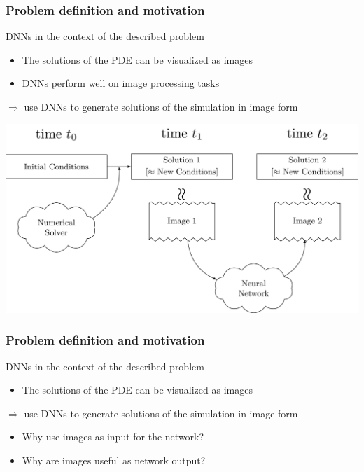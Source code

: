\documentclass[18pt]{beamer}
\begin{document}
\begin{frame}[t]
  \frametitle{Problem definition and motivation}
  DNNs in the context of the described problem
  \begin{itemize}
  \item The solutions of the PDE can be visualized as images
  \item DNNs perform well on image processing tasks
  \end{itemize}
  $\Longrightarrow$ use DNNs to generate solutions of the simulation in image form \\
  \begin{center}
    \includegraphics[scale=0.16]{images/new/overview}
  \end{center}
\end{frame}


\begin{frame}[t]
  \frametitle{Problem definition and motivation}
  DNNs in the context of the described problem
  \begin{itemize}
  \item The solutions of the PDE can be visualized as images
  \end{itemize}
  $\Longrightarrow$ use DNNs to generate solutions of the simulation in image form \\
  \vspace*{1.5cm}
  \begin{itemize}
  \item Why use images as input for the network?
  \item Why are images useful as network output?
  \end{itemize}
\end{frame}
\end{document}
